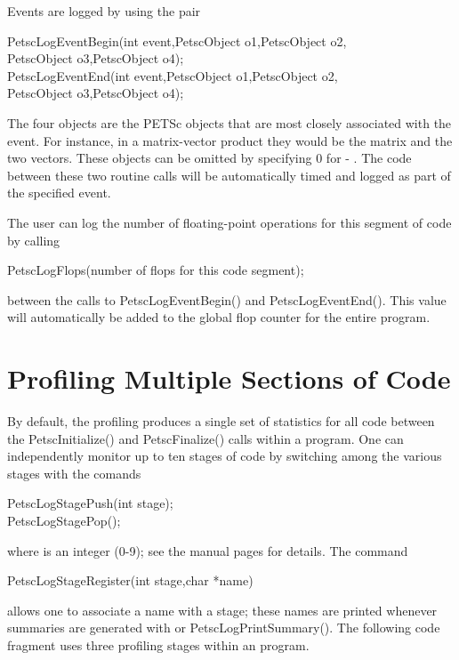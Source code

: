 {{Events are logged by using the pair 
\begin{tabbing}
   PetscLogEventBegin(int event,PetscObject o1,PetscObject o2,\\
                      PetscObject o3,PetscObject o4);\\
   PetscLogEventEnd(int event,PetscObject o1,PetscObject o2,\\
                    PetscObject o3,PetscObject o4);
\end{tabbing}
The 
four objects are the PETSc objects that are most closely associated 
with the event.  For instance, in a matrix-vector product they 
would be the matrix and the two vectors.  These objects can be omitted
by specifying 0 for  - .  The code between these 
two routine calls will be automatically timed and logged as part of the
specified event.

The user can log the number of floating-point operations 
for this segment of code by calling 
\begin{tabbing}
    PetscLogFlops(number of flops for this code segment);
\end{tabbing}
between the calls to PetscLogEventBegin() and PetscLogEventEnd().
This value will automatically be added to the global flop counter for the
entire program.

\section{Profiling Multiple Sections of Code}
\label{sec_profstages}

By default, the profiling produces a single set of statistics for all
code between the PetscInitialize() and PetscFinalize()
calls within a program.  One can independently monitor up to ten
stages of code by switching among the various stages with the comands
 
\begin{tabbing}
   PetscLogStagePush(int stage);\\
   PetscLogStagePop();
\end{tabbing}
where  is an integer (0-9); see the manual pages for details.
The command  
\begin{tabbing}
   PetscLogStageRegister(int stage,char *name)
\end{tabbing}
allows one to associate a name with a stage; these names are printed whenever
summaries are generated with  or PetscLogPrintSummary().
The following code fragment uses three profiling stages within an program.

}}
